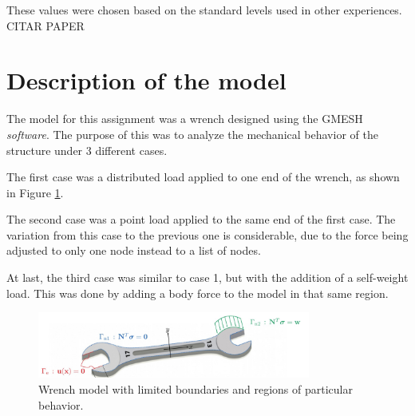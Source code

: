 \documentclass{article}  %
\begin{document}
These values were chosen based on the standard levels used in other experiences. CITAR PAPER

\newpage

\section{Description of the model}

The model for this assignment was a wrench designed using the GMESH \textit{software}. The purpose of this was to analyze the mechanical behavior of the structure under 3 different cases. 

The first case was a distributed load applied to one end of the wrench, as shown in Figure \ref{caso1}.

The second case was a point load applied to the same end of the first case. The variation from this case to the previous one is considerable, due to the force being adjusted to only one node instead to a list of nodes.

At last, the third case was similar to case 1, but with the addition of a self-weight load. This was done by adding a body force to the model in that same region.

\begin{figure}[H]
  \centering
  \includegraphics[width=0.8\textwidth]{img/wrench.png}
  \caption{Wrench model with limited boundaries and regions of particular behavior.}
  \label{caso1}
\end{figure}



\end{document}
